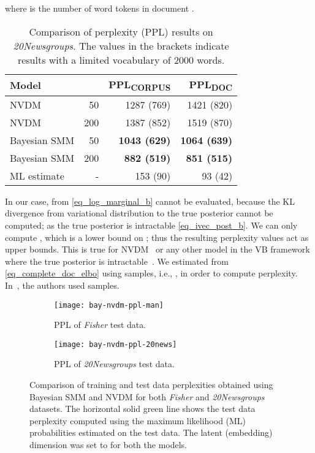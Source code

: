 \documentclass[journal]{IEEEtran}
\begin{document}
where  is the number of word tokens in document .

\begin{table}[t!]
	\begin{center}
		\caption{\label{tab:ppl}Comparison of perplexity (PPL) results on 
			\textit{20Newsgroups}. The values in the brackets indicate results 
			with 
			a limited vocabulary of 2000 words.}
		\begin{tabular}{lrrr} \toprule
			\textbf{Model}  &  & PPL\textsubscript{CORPUS} & 
			PPL\textsubscript{DOC} \\ \midrule
			NVDM         & 50   &  1287 (769) & 1421 (820)  \\
			NVDM         & 200  &  1387 (852) & 1519 (870)  \\
			Bayesian SMM & 50   & \textbf{1043 (629)} & \textbf{1064 (639)}  \\
			Bayesian SMM & 200  & \textbf{882 (519)} & \textbf{851 (515)}  \\ 
			\midrule
			ML estimate  &  -   & 153 (90)  & 93 (42) \\ \bottomrule
		\end{tabular}
	\end{center}
\end{table}

In our case,  from \eqref{eq_log_marginal_b} cannot be 
evaluated, because the KL divergence from variational distribution  to the 
true posterior  cannot be computed; as the true posterior is intractable 
\eqref{eq_ivec_post_b}. We can only compute , which is a 
lower bound on ; thus the resulting perplexity values act as upper 
bounds. This is true for NVDM~\cite{NVI:2016} or any other model in the VB 
framework where the true posterior is intractable~\cite{Bishop:2006:PRML}.
We estimated  from \eqref{eq_complete_doc_elbo} using  
samples, i.e., , in order to compute perplexity. In~\cite{NVI:2016}, 
the authors used  samples.
\begin{figure*}[t!]
	\centering
	\begin{subfigure}[t]{0.45\textwidth}
		\texttt{[image: bay-nvdm-ppl-man]}
		\caption{\label{fig:ppl_man} PPL of \textit{Fisher} test data.}
	\end{subfigure}
	\begin{subfigure}[t]{0.45\textwidth}
		\texttt{[image: bay-nvdm-ppl-20news]}
		\caption{\label{fig:ppl_20news} PPL of \textit{20Newsgroups} test data.}
	\end{subfigure}
	\caption{Comparison of training and test data perplexities obtained using 
	Bayesian SMM and NVDM for both \textit{Fisher} and \textit{20Newsgroups} datasets. The 
	horizontal solid green line shows the test data perplexity computed using the maximum 
	likelihood (ML) probabilities estimated on the test data. The latent (embedding) dimension 
	was set to  for both the models.}
\end{figure*}
\end{document}
